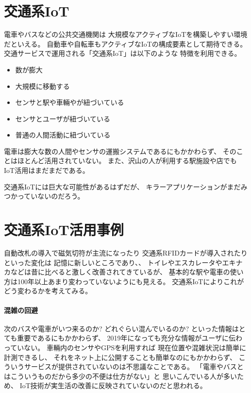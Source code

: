 \documentclass[twocolumn,10pt]{jarticle}
\begin{document}
\section{交通系IoT}
  
電車やバスなどの公共交通機関は
大規模なアクティブなIoTを構築しやすい環境だといえる。
自動車や自転車もアクティブなIoTの構成要素として期待できる。
%
交通サービスで運用される「交通系IoT」は以下のような
特徴を利用できる。

\begin{itemize}
  \setlength{\itemsep}{0cm} %
  \item 数が膨大
  \item 大規模に移動する
  \item センサと駅や車輛やが紐づいている
  \item センサとユーザが紐づいている
  \item 普通の人間活動に紐づいている
\end{itemize}


電車は膨大な数の人間やセンサの運搬システムであるにもかかわらず、
そのことはほとんど活用されていない。
また、沢山の人が利用する駅施設や店でも
IoT活用はまだまだである。

交通系IoTには巨大な可能性があるはずだが、
キラーアプリケーションがまだみつかっていないのだろう。

% 
% 

\section{交通系IoT活用事例}

自動改札の導入で磁気切符が主流になったり
交通系RFIDカードが導入されたりといった変化は
記憶に新しいところであり、、
トイレやエスカレータやエキナカなどは昔に比べると激しく改善されてきているが、
基本的な駅や電車の使い方は100年以上あまり変わっていないようにも見える。
交通系IoTによりこれがどう変わるかを考えてみる。

\paragraph{混雑の回避}

次のバスや電車がいつ来るのか? どれぐらい混んでいるのか?
といった情報はとても重要であるにもかかわらず、
2019年になっても充分な情報がユーザに伝わっていない。
%
車輛内のセンサやGPSを利用すれば
現在位置や混雑状況は簡単に計測できるし、
それをネット上に公開することも簡単なのにもかかわらず、
こういうサービスが提供されていないのは不思議なことである。
%
「電車やバスとはこういうものだから多少の不便は仕方がない」と
思いこんでいる人が多いため、
IoT技術が実生活の改善に反映されていないのだと思われる。
\end{document}
